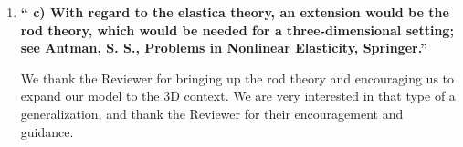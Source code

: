 \documentclass[11pt,letterpaper]{report}
\begin{document}
\begin{enumerate}[label=\textit{1.\arabic*},wide, labelwidth=!, labelindent=0pt]





\newpage
\item \label{r1c4} {\bf ``
c) With regard to the elastica theory, an extension would be the rod theory, which would be needed for a three-dimensional setting; see Antman, S. S., Problems in Nonlinear Elasticity, Springer.''}



We thank the Reviewer for bringing up the rod theory and encouraging us to expand our model to the 3D context. We are very interested in that type of a generalization, and thank the Reviewer for their encouragement and guidance.


\end{enumerate}
\end{document}
